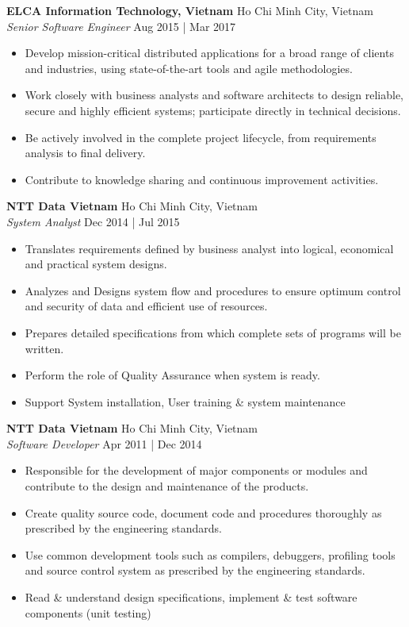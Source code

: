 \documentclass[a4paper]{article}
\begin{document}
\textbf{ELCA Information Technology, Vietnam} \hfill Ho Chi Minh City, Vietnam\\
\textit{Senior Software Engineer} \hfill Aug 2015 | Mar 2017\\
\vspace{-1mm}
\begin{itemize} \itemsep 1pt
	\item Develop mission-critical distributed applications for a broad range of clients and industries, using state-of-the-art tools and agile methodologies.
	\item Work closely with business analysts and software architects to design reliable, secure and highly efficient systems; participate directly in technical decisions.
	\item Be actively involved in the complete project lifecycle, from requirements analysis to final delivery.
	\item Contribute to knowledge sharing and continuous improvement activities.
\end{itemize}
\textbf{NTT Data Vietnam} \hfill Ho Chi Minh City, Vietnam\\
\textit{System Analyst} \hfill Dec 2014 | Jul 2015\\
\vspace{-1mm}
\begin{itemize} \itemsep 1pt
	\item Translates requirements defined by business analyst into logical, economical and practical system designs.
	\item Analyzes and Designs system flow and procedures to ensure optimum control and security of data and efficient use of resources.
	\item Prepares detailed specifications from which complete sets of programs will be written.
	\item Perform the role of Quality Assurance when system is ready.
	\item Support System installation, User training \& system maintenance
\end{itemize}

\newpage

\textbf{NTT Data Vietnam} \hfill Ho Chi Minh City, Vietnam\\
\textit{Software Developer} \hfill Apr 2011 | Dec 2014\\
\vspace{-1mm}
\begin{itemize} \itemsep 1pt
	\item Responsible for the development of major components or modules and contribute to the design and maintenance of the products.
	\item Create quality source code, document code and procedures thoroughly as prescribed by the engineering standards.
	\item Use common development tools such as compilers, debuggers, profiling tools and source control system as prescribed by the engineering standards.
	\item Read \& understand design specifications, implement \& test software components (unit testing)
\end{itemize}
\end{document}
